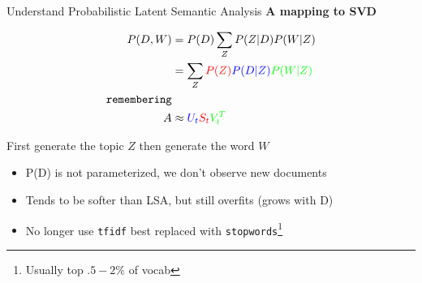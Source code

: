 \documentclass[10pt]{beamer}
\begin{document}
\begin{frame}{Understand Probabilistic Latent Semantic Analysis}
  {\bf A mapping to SVD}

  \begin{align*}
    P(D,W) &= P(D)\sum_Z P(Z|D)P(W|Z)\\
    &= \sum_Z \color{red}P(Z)\color{blue}P(D|Z)\color{green}P(W|Z)\\
    \texttt{remembering}&\\
    A &\approx\color{blue}U_t\color{red}S_t\color{green}V_t^T
  \end{align*}

  First generate the topic $Z$ then generate the word $W$

  \begin{itemize}
  \item P(D) is not parameterized, we don't observe new documents
  \item Tends to be softer than LSA, but still  overfits (grows with D)
  \item No longer use \texttt{tfidf} best replaced with \texttt{stopwords}\footnote{Usually top $.5-2\%$ of vocab}
  \end{itemize}

\end{frame}
\end{document}
